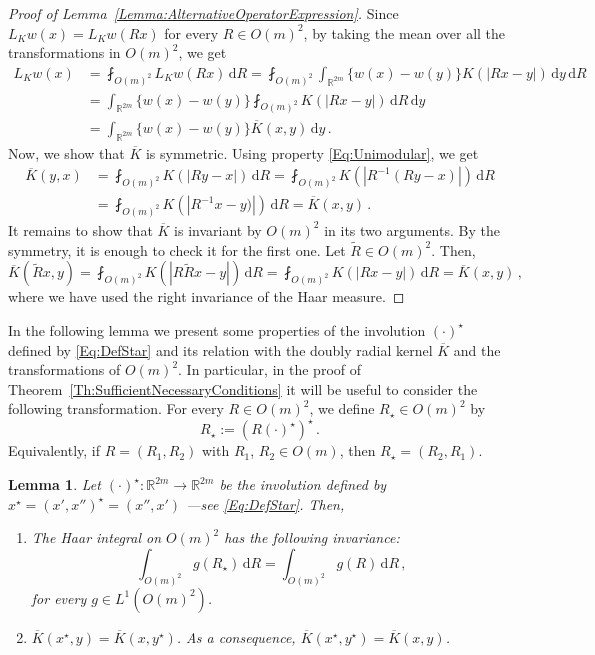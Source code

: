 \documentclass[12pt,reqno]{amsart}
\newtheorem{lemma}[theorem]{Lemma}
\theoremstyle{definition}
\theoremstyle{remark}
\newcommand{\con}[1]{\mathbb{#1}}
\newcommand{\R}{\con{R}} %
\renewcommand{\d}{\,\mathrm{d}} %
\newcommand{\average}{\fint}
\numberwithin{equation}{section}
\begin{document}
\begin{proof}[Proof of Lemma~\ref{Lemma:AlternativeOperatorExpression}]
	Since $L_K w (x) = L_K w (Rx)$ for every $R\in O(m)^2$, by taking the mean over all the transformations in $O(m)^2$, we get
	\begin{align*}
	L_K w(x) &= \average_{O(m)^2} L_K w(Rx)\d R =  \average_{O(m)^2} \int_{\R^{2m}} \{w(x) - w(y)\}K(|Rx - y|) \d y \d R\\
	&= \int_{\R^{2m}} \{w(x) - w(y)\}  \average_{O(m)^2} K(|Rx - y|) \d R  \d y \\
	&= \int_{\R^{2m}} \{w(x) - w(y)\}  \overline{K}(x,y) \d y\,.
	\end{align*}
	Now, we show that $\overline{K}$ is symmetric. Using property \eqref{Eq:Unimodular}, we get
	\begin{align*}
	\overline{K}(y,x) &= \average_{O(m)^2} K(|R y - x|)\d R = \average_{O(m)^2} K(|R^{-1} (R y - x)|)\d R \\
	&= \average_{O(m)^2} K(|R^{-1}x-y)|)\d R = \overline{K}(x,y)\,.
	\end{align*}
	It remains to show that
	$\overline{K}$ is invariant by $O(m)^2$ in its two arguments. By the symmetry, it is enough to
	check it for the first one. Let $\tilde{R} \in O(m)^2$. Then,
	$$
	\overline{K} (\tilde{R}x, y) = \average_{O(m)^2} K(|R \tilde{R} x - y|)\d R  = \average_{O(m)^2} K(|R x - y|)\d R = \overline{K} (x, y)\,,
	$$
	where we have used the right invariance of the Haar measure.
\end{proof}



In the following lemma we present some properties of the involution $(\cdot)^\star$ defined by \eqref{Eq:DefStar} and its relation with the doubly radial kernel $\overline{K}$ and the transformations of $O(m)^2$. In particular, in the proof of Theorem~\ref{Th:SufficientNecessaryConditions} it will be useful to consider the following transformation. For every $R\in O(m)^2$, we define  $R_\star\in O(m)^2$ by 
\begin{equation}
\label{Eq:DefRStar}
R_\star := (R(\cdot)^\star)^\star\,.
\end{equation}
Equivalently, if $R = (R_1, R_2)$ with $R_1$, $R_2 \in O(m)$, then $R_\star = (R_2, R_1)$.

\begin{lemma}
	\label{Lemma:PropertiesStar}
	Let $(\cdot)^\star: \R^{2m} \to \R^{2m}$ be the involution defined by $x^\star = (x',x'')^\star = (x'', x')$
	---see \eqref{Eq:DefStar}.
	Then,
	\begin{enumerate}
		\item
		The Haar integral on $O(m)^2$ has the following invariance:
		\begin{equation}
		\label{Eq:InvarianceByStar}
		\int_{O(m)^2} g(R_\star) \d R = \int_{O(m)^2} g(R) \d R \,,
		\end{equation}
		for every $g \in L^1(O(m)^2)$.
		\item $\overline{K}(x^\star,y) = \overline{K} (x,y^\star)$. As a consequence, $\overline{K}(x^\star,y^\star) = \overline{K} (x,y)$.
	\end{enumerate}
\end{lemma}
\end{document}
